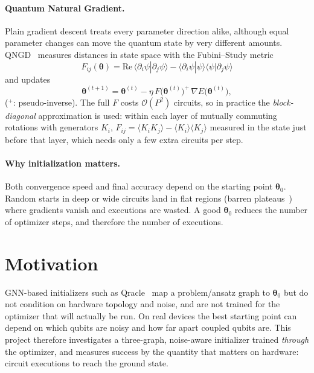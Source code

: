 \documentclass{ssnreview}
\begin{document}
\paragraph{Quantum Natural Gradient.} Plain gradient descent treats every parameter direction
alike, although equal parameter changes can move the quantum state by very different amounts.
QNGD~\cite{stokes2020} measures distances in state space with the Fubini--Study metric
\begin{equation}
  F_{ij}(\boldsymbol\theta)=\mathrm{Re}\,\langle\partial_i\psi|\partial_j\psi\rangle-
  \langle\partial_i\psi|\psi\rangle\langle\psi|\partial_j\psi\rangle
\end{equation}
and updates
\begin{equation}
  \boldsymbol\theta^{(t+1)} = \boldsymbol\theta^{(t)} - \eta\, F\big(\boldsymbol\theta^{(t)}\big)^{+}\,
  \nabla E\big(\boldsymbol\theta^{(t)}\big),
  \label{eq:qngd}
\end{equation}
($^{+}$: pseudo-inverse). The full $F$ costs $\mathcal O(P^2)$ circuits, so in practice the
\emph{block-diagonal} approximation is used: within each layer of mutually commuting rotations
with generators $K_i$, $F_{ij}=\langle K_iK_j\rangle-\langle K_i\rangle\langle K_j\rangle$
measured in the state just before that layer, which needs only a few extra circuits per step.

\paragraph{Why initialization matters.} Both convergence speed and final accuracy depend on the
starting point $\boldsymbol\theta_0$. Random starts in deep or wide circuits land in flat
regions (barren plateaus~\cite{mcclean2018}) where gradients vanish and executions are wasted.
A good $\boldsymbol\theta_0$ reduces the number of optimizer steps, and therefore the number of
executions.

\section{Motivation}
GNN-based initializers such as Qracle~\cite{qracle} map a problem/ansatz graph to
$\boldsymbol\theta_0$ but do not condition on hardware topology and noise, and are not trained
for the optimizer that will actually be run. On real devices the best starting point can depend
on which qubits are noisy and how far apart coupled qubits are. This project therefore
investigates a three-graph, noise-aware initializer trained \emph{through} the optimizer, and
measures success by the quantity that matters on hardware: circuit executions to reach the
ground state.
\end{document}
